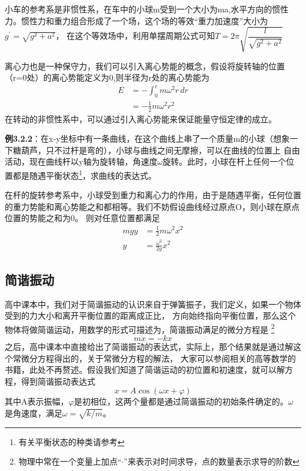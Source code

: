 \documentclass{article}
\begin{document}
    小车的参考系是非惯性系，在车中的小球m受到一个大小为ma,水平方向的惯性力。惯性力和重力组合形成了一个场，这个场的等效“重力加速度”大小为\(g^\prime = \sqrt{g^2+a^2}\)，
    在这个等效场中，利用单摆周期公式可知\(T = 2\pi\sqrt{\dfrac{l}{\sqrt{g^2+a^2}}}\)

    离心力也是一种保守力，我们可以引入离心势能的概念，假设将旋转轴的位置（r=0处）的离心势能定义为0,则半径为r处的离心势能为
    \begin{align*}
        E &= -\int_0^r m\omega^2r \, dr  \\
          &= -\frac{1}{2}m\omega^2r^2
    \end{align*}
    在转动的非惯性系中，可以通过引入离心势能来保证能量守恒定律的成立。

    \textbf{例3.2.2}：在x-y坐标中有一条曲线，在这个曲线上串了一个质量m的小球（想象一下糖葫芦，只不过杆是弯的），小球与曲线之间无摩擦，可以在曲线的位置上
    自由活动，现在曲线杆以y轴为旋转轴，角速度\(\omega\)旋转。此时，小球在杆上任何一个位置都是随遇平衡状态\footnote{有关平衡状态的种类请参考}，求曲线的表达式。

    在杆的旋转参考系中，小球受到重力和离心力的作用，由于是随遇平衡，任何位置的重力势能和离心势能之和都相等。我们不妨假设曲线经过原点O，则小球在原点位置的势能之和为0。
    则对任意位置都满足
    \begin{align*}
        mgy &= \frac{1}{2} m\omega^2 x^2 \\
        y &= \frac{\omega^2}{2g}x^2
    \end{align*}

    \subsection{简谐振动}
    高中课本中，我们对于简谐振动的认识来自于弹簧振子，我们定义，如果一个物体受到的力大小和离开平衡位置的距离成正比，
    方向始终指向平衡位置，那么这个物体将做简谐运动，用数学的形式可描述为，简谐振动满足的微分方程是
    \footnote{物理中常在一个变量上加点“\(\cdot\)”来表示对时间求导，点的数量表示求导的阶数}
    \begin{equation*}
        m\ddot{x} = -kx
    \end{equation*}
    之后，高中课本中直接给出了简谐振动的表达式，实际上，那个结果就是通过解这个常微分方程得出的，关于常微分方程的解法，
    大家可以参阅相关的高等数学的书籍，此处不再赘述。假设我们知道了简谐运动的初位置和初速度，就可以解方程，得到简谐振动表达式
    \begin{equation*}
        x = A\cos(\omega x + \varphi)
    \end{equation*}
    其中A表示振幅，\(\varphi\)是初相位，这两个量都是通过简谐振动的初始条件确定的。\(\omega\)是角速度，满足\(\omega = \sqrt{k/m}\)。
\end{document}
